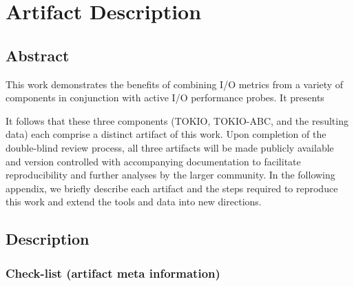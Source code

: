 \appendix

\section{Artifact Description} \label{sec:appendix/artifacts}

\subsection{Abstract}

This work demonstrates the benefits of combining I/O metrics from a variety of components in conjunction with active I/O performance probes.
It presents 

It follows that these three components (TOKIO, TOKIO-ABC, and the resulting data) each comprise a distinct artifact of this work.  Upon completion of the double-blind review process, all three artifacts will be made publicly available and version controlled with accompanying documentation to facilitate reproducibility and further analyses by the larger community.  In the following appendix, we briefly describe each artifact and the steps required to reproduce this work and extend the tools and data into new directions.

\subsection{Description}

\subsubsection{Check-list (artifact meta information)}

